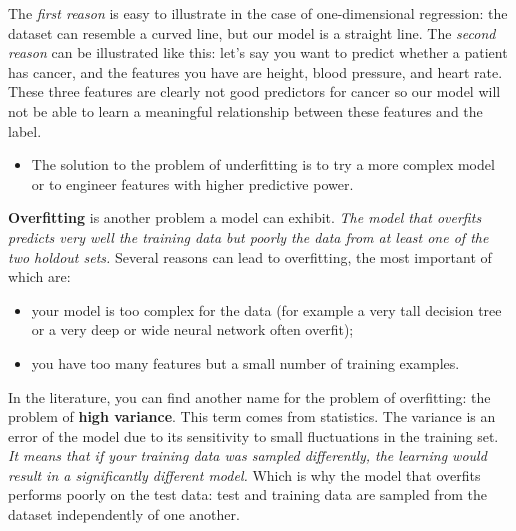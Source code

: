 \documentclass[8pt,dvipsnames]{beamer}
\begin{document}
\begin{frame}
	The \textit{first reason} is easy to illustrate in the case of one-dimensional regression: the dataset can resemble a curved line, but our model is a straight line. The \textit{second reason} can be illustrated like this: let's say you want to predict whether a patient has cancer, and the features you have are height, blood pressure, and heart rate. These three features are clearly not good predictors for cancer so our model will not be able to learn a meaningful relationship between these features and the label.
	\begin{itemize}
		\item The solution to the problem of underfitting is to try a more complex model or to engineer features with higher predictive power.
	\end{itemize}
\end{frame}

\begin{frame}
	\textbf{Overfitting} is another problem a model can exhibit. \textit{The model that overfits predicts very well the training data but poorly the data from at least one of the two holdout sets.}  Several reasons can lead to overfitting, the most important of which are:
	\begin{itemize}
		\item your model is too complex for the data (for example a very tall decision tree or a very deep or wide neural network often overfit);
		\item you have too many features but a small number of training examples.
	\end{itemize}
	In the literature, you can find another name for the problem of overfitting: the problem of \textbf{high variance}. This term comes from statistics. The variance is an error of the model due to its sensitivity to small fluctuations in the training set. \textit{It means that if your training data was sampled differently, the learning would result in a significantly different model.} Which is why the model that overfits performs poorly on the test data: test and training data are sampled from the dataset independently of one another.
\end{frame}
\end{document}
